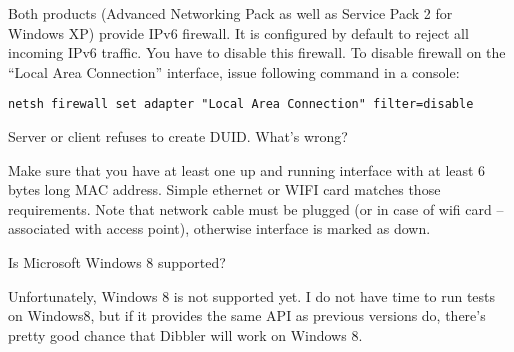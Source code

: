 \A Both products (Advanced Networking Pack as well as Service Pack 2
for Windows XP) provide IPv6 firewall. It is configured by default to
reject all incoming IPv6 traffic. You have to disable this
firewall. To disable firewall on the ``Local Area Connection''
interface, issue following command in a console:

\begin{lstlisting}
netsh firewall set adapter "Local Area Connection" filter=disable
\end{lstlisting}

\Q Server or client refuses to create DUID. What's wrong?

\A Make sure that you have at least one up and running interface with
at least 6 bytes long MAC address. Simple ethernet or WIFI card
matches those requirements. Note that network cable must be plugged
(or in case of wifi card -- associated with access point), otherwise
interface is marked as down.

\Q Is Microsoft Windows 8 supported?

\A Unfortunately, Windows 8 is not supported yet. I do not have time
to run tests on Windows8, but if it provides the same API as previous
versions do, there's pretty good chance that Dibbler will work on
Windows 8.
